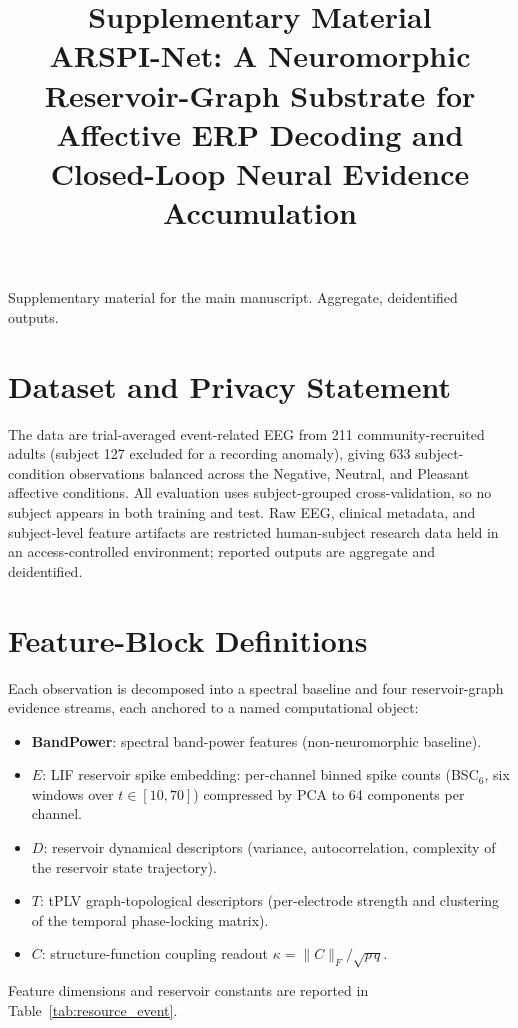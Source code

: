 \documentclass[10pt]{article}
\title{Supplementary Material\\
ARSPI-Net: A Neuromorphic Reservoir-Graph Substrate for Affective ERP Decoding and Closed-Loop Neural Evidence Accumulation}
\author{}
\date{}
\begin{document}
\maketitle
\vspace{-3em}
\begin{center}\small Supplementary material for the main manuscript. Aggregate, deidentified outputs.\end{center}

\section{Dataset and Privacy Statement}
The data are trial-averaged event-related EEG from 211 community-recruited adults
(subject 127 excluded for a recording anomaly), giving 633 subject-condition
observations balanced across the Negative, Neutral, and Pleasant affective
conditions. All evaluation uses subject-grouped cross-validation, so no subject
appears in both training and test. Raw EEG, clinical metadata, and subject-level
feature artifacts are restricted human-subject research data held in an access-controlled environment; reported outputs are aggregate and deidentified.

\section{Feature-Block Definitions}
Each observation is decomposed into a spectral baseline and four reservoir-graph
evidence streams, each anchored to a named computational object:
\begin{itemize}
\item \textbf{BandPower}: spectral band-power features (non-neuromorphic baseline).
\item \textbf{$E$}: LIF reservoir spike embedding: per-channel binned spike
counts (BSC$_6$, six windows over $t\in[10,70]$) compressed by PCA to 64
components per channel.
\item \textbf{$D$}: reservoir dynamical descriptors (variance, autocorrelation,
complexity of the reservoir state trajectory).
\item \textbf{$T$}: tPLV graph-topological descriptors (per-electrode strength
and clustering of the temporal phase-locking matrix).
\item \textbf{$C$}: structure-function coupling readout
$\kappa=\|C\|_F/\sqrt{p\,q}$.
\end{itemize}
Feature dimensions and reservoir constants are reported in
Table~\ref{tab:resource_event}.

\end{document}
